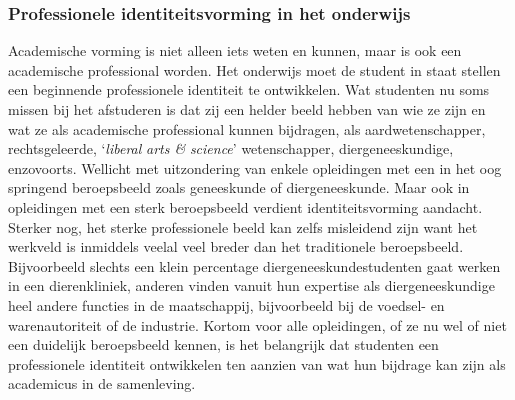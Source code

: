 \documentclass[smallauthor, chapterhaspagenum, nochapterinheader, pagenuminheader,  bigchapnum,medium2, tocpages,  garamond, titleinheader]{jote-book}
\begin{document}
	\subsubsection{Professionele identiteitsvorming in het onderwijs}



	Academische vorming is niet alleen iets weten en kunnen, maar is ook een academische professional worden. Het onderwijs moet de student in staat stellen een beginnende professionele identiteit te ontwikkelen. Wat studenten nu soms missen bij het afstuderen is dat zij een helder beeld hebben van wie ze zijn en wat ze als academische professional kunnen bijdragen, als aardwetenschapper, rechtsgeleerde, ‘\emph{liberal}\emph{ arts \& }\emph{science}' wetenschapper, diergeneeskundige, enzovoorts. Wellicht met uitzondering van enkele opleidingen met een in het oog springend beroepsbeeld zoals geneeskunde of diergeneeskunde. Maar ook in opleidingen met een sterk beroepsbeeld verdient identiteitsvorming aandacht. Sterker nog, het sterke professionele beeld kan zelfs misleidend zijn want het werkveld is inmiddels veelal veel breder dan het traditionele beroepsbeeld. Bijvoorbeeld slechts een klein percentage diergeneeskundestudenten gaat werken in een dierenkliniek, anderen vinden vanuit hun expertise als diergeneeskundige heel andere functies in de maatschappij, bijvoorbeeld bij de voedsel- en warenautoriteit of de industrie. Kortom voor alle opleidingen, of ze nu wel of niet een duidelijk beroepsbeeld kennen, is het belangrijk dat studenten een professionele identiteit ontwikkelen ten aanzien van wat hun bijdrage kan zijn als academicus in de samenleving.
\end{document}

